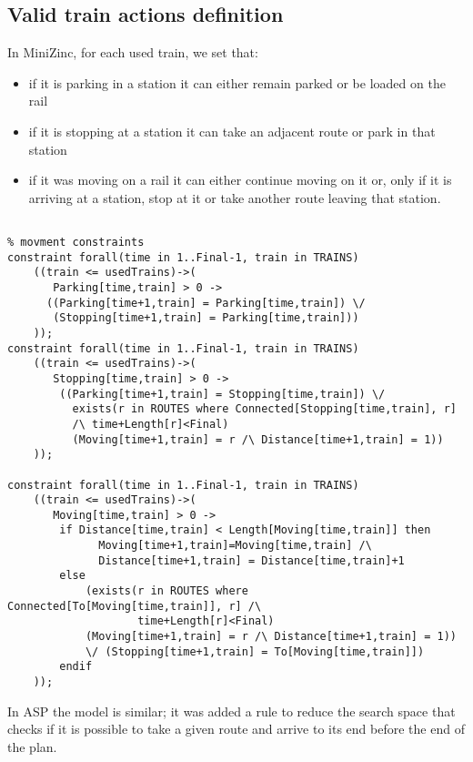 \documentclass[11pt]{article}
\begin{document}
\subsection{Valid train actions definition}
In MiniZinc, for each used train, we set that:
\begin{itemize}
\item if it is parking in a station it can either remain parked or be loaded on the rail
\item if it is stopping at a station it can take an adjacent route or park in that station 
\item if it was moving on a rail it can either continue 
moving on it or, only if it is arriving at a station, stop at it or take another route 
leaving that station.
\end{itemize}
\begin{verbatim}
      
% movment constraints
constraint forall(time in 1..Final-1, train in TRAINS)
    ((train <= usedTrains)->(
       Parking[time,train] > 0 ->
      ((Parking[time+1,train] = Parking[time,train]) \/
       (Stopping[time+1,train] = Parking[time,train]))
    ));      
constraint forall(time in 1..Final-1, train in TRAINS)
    ((train <= usedTrains)->(
       Stopping[time,train] > 0 ->
        ((Parking[time+1,train] = Stopping[time,train]) \/
          exists(r in ROUTES where Connected[Stopping[time,train], r]
          /\ time+Length[r]<Final)
          (Moving[time+1,train] = r /\ Distance[time+1,train] = 1))
    ));                     
      
constraint forall(time in 1..Final-1, train in TRAINS)
    ((train <= usedTrains)->(
       Moving[time,train] > 0 -> 
        if Distance[time,train] < Length[Moving[time,train]] then 
              Moving[time+1,train]=Moving[time,train] /\
              Distance[time+1,train] = Distance[time,train]+1 
        else 
            (exists(r in ROUTES where Connected[To[Moving[time,train]], r] /\ 
                    time+Length[r]<Final)
            (Moving[time+1,train] = r /\ Distance[time+1,train] = 1)) 
            \/ (Stopping[time+1,train] = To[Moving[time,train]]) 
        endif
    ));  
\end{verbatim}
In ASP the model is similar; it was added a rule to reduce the search space
that checks if it is possible to take a given route and arrive to its end before the end 
of the plan.
\end{document}
